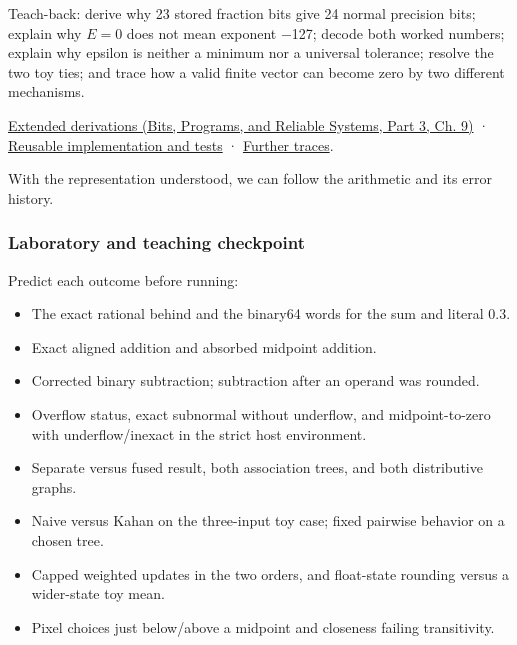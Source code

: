 Teach-back: derive why 23 stored fraction bits give 24 normal precision bits; explain why \(E=0\) does not mean exponent −127; decode both worked numbers; explain why epsilon is neither a minimum nor a universal tolerance; resolve the two toy ties; and trace how a valid finite vector can become zero by two different mechanisms.

\href{../01-Bits-Programs-and-Reliable-Systems-P03/main.pdf\#nameddest=01-foundations-i-ch011-m004---floating-point-fields-spacing-and-rounding}{Extended derivations (Bits, Programs, and Reliable Systems, Part 3, Ch. 9)} · \hyperref[appendix-4e2236f53445-m004---binary-interchange-inspection-and-strict-rounding-laboratory]{Reusable implementation and tests} · \hyperref[appendix-92ff77d4dfdc-m004---from-fields-to-values-and-failure-paths]{Further traces}.

With the representation understood, we can follow the arithmetic and its error history.

\subsubsection{Laboratory and teaching checkpoint}\label{01-foundations-i-ch001-laboratory-and-teaching-checkpoint}

\hypertarget{01-foundations-i-ch001-laboratory-and-teaching-checkpoint}{}

Predict each outcome before running:

\begin{itemize}
\tightlist
\item
  The exact rational behind  and the binary64 words for the sum and literal 0.3.
\item
  Exact aligned addition and absorbed midpoint addition.
\item
  Corrected binary subtraction; subtraction after an operand was rounded.
\item
  Overflow status, exact subnormal without underflow, and midpoint-to-zero with underflow/inexact in the strict host environment.
\item
  Separate versus fused result, both association trees, and both distributive graphs.
\item
  Naive versus Kahan on the three-input toy case; fixed pairwise behavior on a chosen tree.
\item
  Capped weighted updates in the two orders, and float-state rounding versus a wider-state toy mean.
\item
  Pixel choices just below/above a midpoint and closeness failing transitivity.
\end{itemize}

